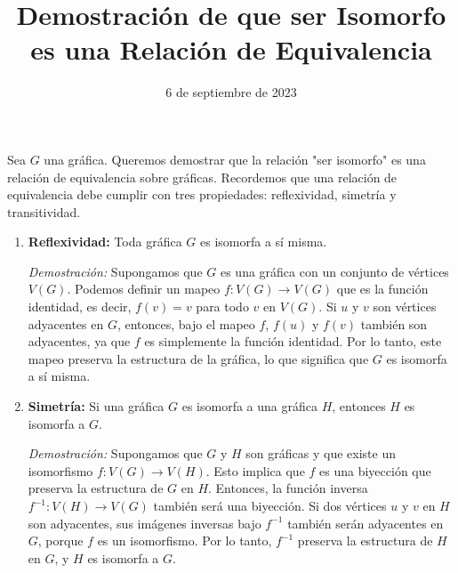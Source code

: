 \documentclass{article}
\begin{document}
\title{Demostración de que ser Isomorfo es una Relación de Equivalencia}
\date{6 de septiembre de 2023}
\maketitle

Sea \( G \) una gráfica. Queremos demostrar que la relación "ser isomorfo" es una relación de equivalencia sobre gráficas. Recordemos que una relación de equivalencia debe cumplir con tres propiedades: reflexividad, simetría y transitividad.

\begin{enumerate}
    \item \textbf{Reflexividad:} Toda gráfica \( G \) es isomorfa a sí misma. 

    \textit{Demostración:}
    Supongamos que \( G \) es una gráfica con un conjunto de vértices \( V(G) \). Podemos definir un mapeo \( f: V(G) \to V(G) \) que es la función identidad, es decir, \( f(v) = v \) para todo \( v \) en \( V(G) \). Si \( u \) y \( v \) son vértices adyacentes en \( G \), entonces, bajo el mapeo \( f \), \( f(u) \) y \( f(v) \) también son adyacentes, ya que \( f \) es simplemente la función identidad. Por lo tanto, este mapeo preserva la estructura de la gráfica, lo que significa que \( G \) es isomorfa a sí misma.

    \begin{center}
    \end{center}
    
    \item \textbf{Simetría:} Si una gráfica \( G \) es isomorfa a una gráfica \( H \), entonces \( H \) es isomorfa a \( G \).

    \textit{Demostración:}
    Supongamos que \( G \) y \( H \) son gráficas y que existe un isomorfismo \( f: V(G) \to V(H) \). Esto implica que \( f \) es una biyección que preserva la estructura de \( G \) en \( H \). Entonces, la función inversa \( f^{-1}: V(H) \to V(G) \) también será una biyección. Si dos vértices \( u \) y \( v \) en \( H \) son adyacentes, sus imágenes inversas bajo \( f^{-1} \) también serán adyacentes en \( G \), porque \( f \) es un isomorfismo. Por lo tanto, \( f^{-1} \) preserva la estructura de \( H \) en \( G \), y \( H \) es isomorfa a \( G \).


\end{enumerate}
\end{document}

